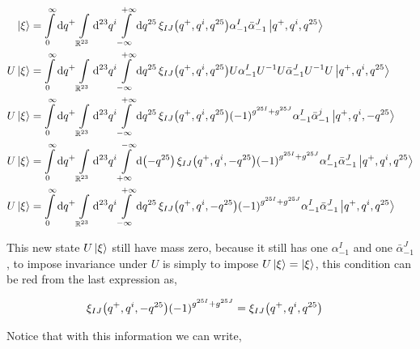 \begin{align*}
    \ket{\xi}&=\int\limits_0^\infty\dd{q^+}\int\limits_{\mathbb R^{23}}\dd[23]{q^i}\int\limits_{-\infty}^{+\infty}\dd{q^{25}}\xi_{IJ}\qty(q^+,q^i,q^{25})\alpha^I_{-1}{\bar\alpha}^J_{-1}\ket{q^+,q^i,q^{25}}\\
    U\ket{\xi}&=\int\limits_0^\infty\dd{q^+}\int\limits_{\mathbb R^{23}}\dd[23]{q^i}\int\limits_{-\infty}^{+\infty}\dd{q^{25}}\xi_{IJ}\qty(q^+,q^i,q^{25})U\alpha^I_{-1}U^{-1}U{\bar\alpha}^J_{-1}U^{-1}U\ket{q^+,q^i,q^{25}}\\
    U\ket{\xi}&=\int\limits_0^\infty\dd{q^+}\int\limits_{\mathbb R^{23}}\dd[23]{q^i}\int\limits_{-\infty}^{+\infty}\dd{q^{25}}\xi_{IJ}\qty(q^+,q^i,q^{25})\qty(-1)^{g^{25I}+g^{25J}}\alpha^I_{-1}{\bar\alpha}^j_{-1}\ket{q^+,q^i,-q^{25}}\\
    U\ket{\xi}&=\int\limits_0^\infty\dd{q^+}\int\limits_{\mathbb R^{23}}\dd[23]{q^i}\int\limits_{+\infty}^{-\infty}\dd{\qty(-q^{25})}\xi_{IJ}\qty(q^+,q^i,-q^{25})\qty(-1)^{g^{25I}+g^{25J}}\alpha^I_{-1}{\bar\alpha}^J_{-1}\ket{q^+,q^i,q^{25}}\\
    U\ket{\xi}&=\int\limits_0^\infty\dd{q^+}\int\limits_{\mathbb R^{23}}\dd[23]{q^i}\int\limits_{-\infty}^{+\infty}\dd{q^{25}}\xi_{IJ}\qty(q^+,q^i,-q^{25})\qty(-1)^{g^{25I}+g^{25J}}\alpha^I_{-1}{\bar\alpha}^J_{-1}\ket{q^+,q^i,q^{25}}
\end{align*}

This new state $U\ket\xi$ still have mass zero, because it still has one $\alpha^I_{-1}$ and one ${\bar\alpha}^J_{-1}$, to impose invariance under $U$ 
is simply to impose $U\ket\xi=\ket\xi$, this condition can be red from the last expression as,

\begin{align*}
    \xi_{IJ}\qty(q^+,q^i,-q^{25})\qty(-1)^{g^{25I}+g^{25J}}&=\xi_{IJ}\qty(q^+,q^i,q^{25})
\end{align*}

Notice that with this information we can write,

